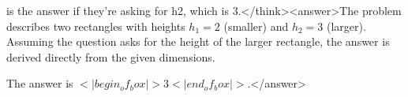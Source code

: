 is the answer if they're asking for h2, which is 3.</think><answer>The problem describes two rectangles with heights \( h_1 = 2 \) (smaller) and \( h_2 = 3 \) (larger). Assuming the question asks for the height of the larger rectangle, the answer is derived directly from the given dimensions.  

The answer is \(<|begin_of_box|>3<|end_of_box|>\).</answer>